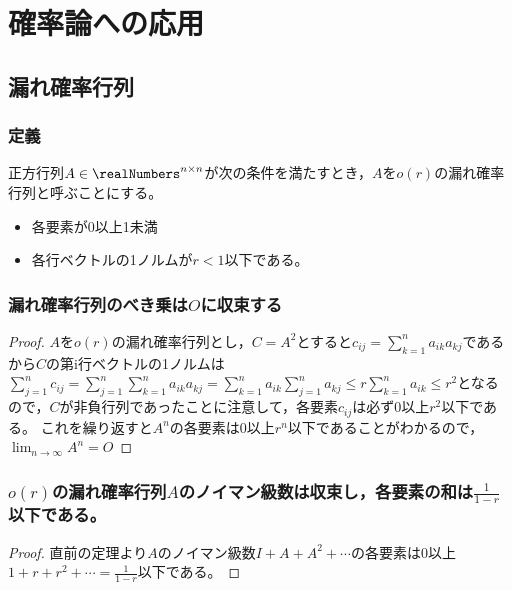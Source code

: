 \chapter{確率論への応用}
    \section{漏れ確率行列}
        \subsection{定義}
            \begin{shadebox}
                正方行列$A\in\realNumbers^{n\times n}$が次の条件を満たすとき，$A$を$o(r)$の漏れ確率行列と呼ぶことにする。
                \begin{itemize}
                    \item 各要素が0以上1未満
                    \item 各行ベクトルの1ノルムが$r<1$以下である。
                \end{itemize}
            \end{shadebox}
        \subsection{漏れ確率行列のべき乗は\texorpdfstring{$O$}{O}に収束する}
            \begin{proof}
                $A$を$o(r)$の漏れ確率行列とし，$C=A^2$とすると$c_{ij} = \sum_{k=1}^{n}{a_{ik}a_{kj}}$であるから$C$の第i行ベクトルの1ノルムは
                $\sum_{j=1}^{n}{c_{ij}} = \sum_{j=1}^{n}{\sum_{k=1}^{n}{a_{ik}a_{kj}}} = \sum_{k=1}^{n}{a_{ik}\sum_{j=1}^{n}{a_{kj}}} \leq r\sum_{k=1}^{n}{a_{ik}} \leq r^2$となるので，$C$が非負行列であったことに注意して，各要素$c_{ij}$は必ず0以上$r^2$以下である。
                これを繰り返すと$A^n$の各要素は0以上$r^n$以下であることがわかるので，$\lim_{n\rightarrow\infty}{A^n}=O$
            \end{proof}
        \subsection{\texorpdfstring{$o(r)$}{o(r)}の漏れ確率行列\texorpdfstring{$A$}{A}のノイマン級数は収束し，各要素の和は\texorpdfstring{$\frac{1}{1-r}$}{1/(1-r)}以下である。}
            \begin{proof}
                直前の定理より$A$のノイマン級数$I+A+A^2+\dotsb$の各要素は0以上$1+r+r^2+\dotsb=\frac{1}{1-r}$以下である。
            \end{proof}